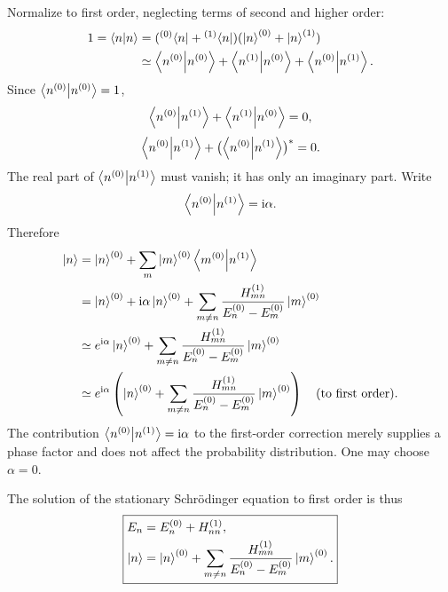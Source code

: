 Normalize to first order, neglecting terms of second and higher order:
\begin{equation}\begin{aligned}
 1=\left\langle n\middle|n\right\rangle
 &=({}^{(0)}\!\left\langle n\right|+{}^{(1)}\!\left\langle n\right|)
 (\left|n\right\rangle^{(0)}+\left|n\right\rangle^{(1)})\\
 &\simeq\left\langle n^{(0)}\middle|n^{(0)}\right\rangle
 +\left\langle n^{(1)}\middle|n^{(0)}\right\rangle
 +\left\langle n^{(0)}\middle|n^{(1)}\right\rangle.
\end{aligned}\end{equation}
Since $\left\langle n^{(0)}\middle|n^{(0)}\right\rangle=1$,
\begin{equation}
 \left\langle n^{(0)}\middle|n^{(1)}\right\rangle+\left\langle n^{(1)}\middle|n^{(0)}\right\rangle=0,
\end{equation}
\begin{equation}
 \left\langle n^{(0)}\middle|n^{(1)}\right\rangle
 +\bigl(\left\langle n^{(0)}\middle|n^{(1)}\right\rangle\bigr)^*=0.
\end{equation}
The real part of $\left\langle n^{(0)}\middle|n^{(1)}\right\rangle$ must vanish; it has only an imaginary part. Write
\begin{equation}
 \left\langle n^{(0)}\middle|n^{(1)}\right\rangle=\mathrm{i}\alpha.
\end{equation}
Therefore
\begin{equation}\begin{aligned}
 \left|n\right\rangle
 &=\left|n\right\rangle^{(0)}+\sum_m\left|m\right\rangle^{(0)}\left\langle m^{(0)}\middle|n^{(1)}\right\rangle\\
 &=\left|n\right\rangle^{(0)}+\mathrm{i}\alpha\left|n\right\rangle^{(0)}
 +\sum_{m\ne n}\frac{H_{mn}^{(1)}}{E_n^{(0)}-E_m^{(0)}}\left|m\right\rangle^{(0)}\\
 &\simeq e^{\mathrm{i}\alpha}\left|n\right\rangle^{(0)}
 +\sum_{m\ne n}\frac{H_{mn}^{(1)}}{E_n^{(0)}-E_m^{(0)}}\left|m\right\rangle^{(0)}\\
 &\simeq e^{\mathrm{i}\alpha}\left(
 \left|n\right\rangle^{(0)}+\sum_{m\ne n}\frac{H_{mn}^{(1)}}{E_n^{(0)}-E_m^{(0)}}\left|m\right\rangle^{(0)}\right)
 \quad\text{(to first order)}.
\end{aligned}\end{equation}
The contribution $\left\langle n^{(0)}\middle|n^{(1)}\right\rangle=\mathrm{i}\alpha$ to the first-order correction merely supplies a phase factor and does not affect the probability distribution. One may choose $\alpha=0$.

The solution of the stationary Schr\"odinger equation to first order is thus
\begin{equation}
 \boxed{\begin{aligned}
 E_n&=E_n^{(0)}+H_{nn}^{(1)},\\
 \left|n\right\rangle&=\left|n\right\rangle^{(0)}
 +\sum_{m\ne n}\frac{H_{mn}^{(1)}}{E_n^{(0)}-E_m^{(0)}}\left|m\right\rangle^{(0)}.
 \end{aligned}}
\end{equation}
